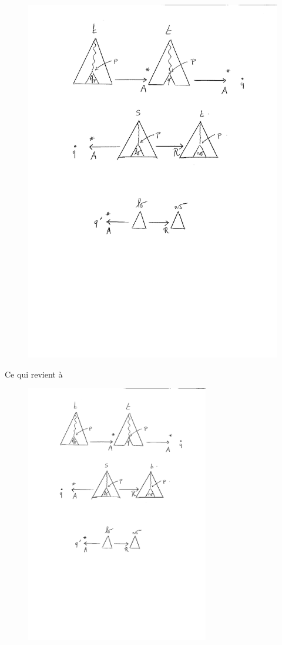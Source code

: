 \begin{figure}[ht!]
  \centering
  \includegraphics[width=12cm]{2_prerequis/cp1}
\end{figure}
Ce qui revient à\\
\begin{figure}[ht!]
  \centering
  \includegraphics[width=8cm]{2_prerequis/cp2}
\end{figure}

